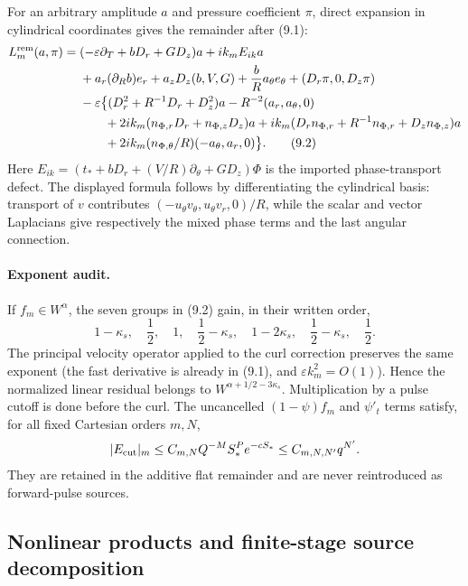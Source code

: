 \documentclass[10pt,a4paper]{article}
\begin{document}
For an arbitrary amplitude $a$ and pressure coefficient $\pi$, direct
expansion in cylindrical coordinates gives the remainder after (9.1):
\begin{align}
 L^{\rm rem}_m(a,\pi)={}&(-\varepsilon\partial_T+bD_r+GD_z)a
 +ik_m E_{ik}a\\
 &+a_r(\partial_Rb)e_r+a_zD_z(b,V,G)+\frac{b}{R}a_\theta e_\theta
 +(D_r\pi,0,D_z\pi)\\
 &-\varepsilon\big\{(D_r^2+R^{-1}D_r+D_z^2)a-R^{-2}(a_r,a_\theta,0)\\
 &\qquad +2ik_m(n_{\Phi,r}D_r+n_{\Phi,z}D_z)a
 +ik_m(D_rn_{\Phi,r}+R^{-1}n_{\Phi,r}+D_zn_{\Phi,z})a\\
 &\qquad +2ik_m(n_{\Phi,\theta}/R)(-a_\theta,a_r,0)\big\}.       \tag{9.2}
\end{align}
Here $E_{ik}=(t_*+bD_r+(V/R)\partial_\theta+GD_z)\Phi$ is the imported
phase-transport defect.  The displayed formula follows by differentiating the
cylindrical basis: transport of $v$ contributes
$(-u_\theta v_\theta,u_\theta v_r,0)/R$, while the scalar and vector Laplacians
give respectively the mixed phase terms and the last angular connection.

\paragraph{Exponent audit.}
If $f_m\in W^\alpha$, the seven groups in (9.2) gain, in their written order,
\[
1-\kappa_s,\quad \frac{1}{2},\quad 1,\quad \frac{1}{2}-\kappa_s,
\quad1-2\kappa_s,\quad \frac{1}{2}-\kappa_s,\quad \frac{1}{2}.
\]
The principal velocity operator applied to the curl correction preserves the
same exponent (the fast derivative is already in (9.1), and
$\varepsilon k_m^2=O(1)$).  Hence the normalized linear residual belongs to
$W^{\alpha+1/2-3\kappa_s}$.  Multiplication by a pulse cutoff is done before
the curl.  The uncancelled $(1-\psi)f_m$ and $\psi'_t$ terms satisfy, for all
fixed Cartesian orders $m,N$,
\[
 |E_{\rm cut}|_m\le C_{m,N}Q^{-M}S_*^P e^{-cS_*}\le C_{m,N,N'}q^{N'} .
\]
They are retained in the additive flat remainder and are never reintroduced as
forward-pulse sources.

\subsection{Nonlinear products and finite-stage source decomposition}
\label{subsec:stage9-products}
\end{document}
